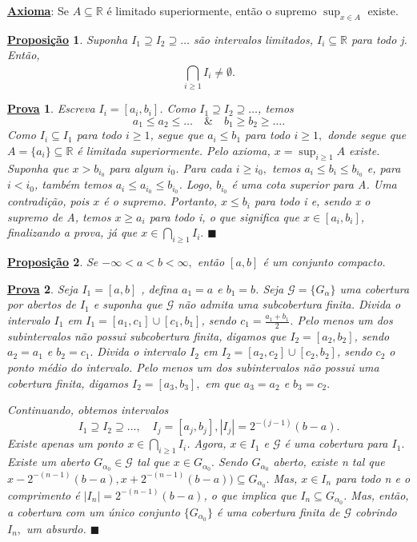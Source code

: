 \documentclass{article}
\newtheorem*{prop*}{\underline{Proposi\c c\~ao}}
\newtheorem*{proof*}{\underline{Prova}}
\renewcommand\qedsymbol{$\blacksquare$}
\begin{document}
\underline{\textbf{Axioma}}: Se \(A\subseteq \mathbb{R}\) é limitado superiormente, então o supremo \(\sup_{x\in A}\) existe.

\begin{prop*}
	Suponha \(I_{1}\supseteq I_{2}\supseteq \dotsc \) são intervalos limitados, \(I_{i}\subseteq \mathbb{R}\) para todo j. Então,
	\[
		\bigcap_{i\geq 1}^{}I_{i}\neq\emptyset.
	\]
\end{prop*}
\begin{proof*}
	Escreva \(I_{i} = [a_{i}, b_{i}]\). Como \(I_{1}\supseteq I_{2}\supseteq \dotsc \), temos
	\[
		a_{1} \leq a_{2} \leq \dotsc \quad\&\quad b_{1} \geq b_{2} \geq  \dotsc .
	\]
	Como \(I_{i}\subseteq I_{1}\) para todo \(i \geq 1\), segue que \(a_{i} \leq b_{1}\) para todo \(i\geq 1,\) donde segue que \(A = \{a_{i}\}\subseteq \mathbb{R}\) é limitada superiormente.
	Pelo axioma, \(x = \sup_{i\geq 1}A\) existe. Suponha que \(x > b_{i_{0}}\) para algum \(i_{0}\). Para cada \(i \geq i_{0},\) temos \(a_{i}\leq b_{i} \leq b_{i_{0}}\) e, para
	\(i < i_{0}\), também temos \(a_{i}\leq a_{i_{0}}\leq b_{i_{0}}\). Logo, \(b_{i_{0}}\) é uma cota superior para A. Uma contradição, pois \(x\) é o supremo. Portanto,
	\(x\leq b_{i}\) para todo i e, sendo x o supremo de A, temos \(x \geq a_{i}\) para todo i, o que significa que \(x\in [a_{i}, b_{i}]\), finalizando a prova, já que \(x\in \bigcap_{i\geq 1}^{}I_{i}.\) \qedsymbol
\end{proof*}
\begin{prop*}
	Se \(-\infty< a < b < \infty,\) então \([a, b]\) é um conjunto compacto.
\end{prop*}
\begin{proof*}
	Seja \(I_{1} = [a, b]\) , defina \(a_{1} = a \) e \(b_{1} = b\). Seja \(\mathcal{G} = \{G_{\alpha }\}\) uma cobertura por abertos de \(I_{1}\) e suponha
	que \(\mathcal{G}\) não admita uma subcobertura finita. Divida o intervalo \(I_{1}\) em \(I_{1} = [a_{1}, c_{1}]\cup [c_{1}, b_{1}]\), sendo \(c_{1} = \frac{a_{1}+b_{1}}{2}\). Pelo menos
	um dos subintervalos não possui subcobertura finita, digamos que \(I_{2} = [a_{2}, b_{2}]\), sendo \(a_{2} = a_{1}\) e \(b_{2} = c_{1}.\) Divida o intervalo \(I_{2}\) em \(I_{2} = [a_{2}, c_{2}]\cup [c_{2}, b_{2}]\), sendo
	\(c_{2}\) o ponto médio do intervalo. Pelo menos um dos subintervalos não possui uma cobertura finita, digamos \(I_{2} = [a_{3}, b_{3}],\) em que \(a_{3} = a_{2}\) e \(b_{3} = c_{2}.\)

	Continuando, obtemos intervalos
	\[
		I_{1}\supseteq I_{2}\supseteq \dotsc ,\quad I_{j} = [a_{j}, b_{j}], |I_{j}| = 2^{-(j-1)}(b-a).
	\]
	Existe apenas um ponto \(x\in \bigcap_{i\geq 1}^{}I_{i}\). Agora, \(x\in I_{1}\) e \(\mathcal{G}\) é uma cobertura para \(I_{1}.\) Existe um aberto \(G_{\alpha_{0}}\in \mathcal{G}\) tal que
	\(x\in G_{\alpha_{0}}.\) Sendo \(G_{\alpha_{0}}\) aberto, existe n tal que \(x - 2^{-(n-1)}(b-a), x+2^{-(n-1)}(b-a))\subseteq G_{\alpha_{0}}.\) Mas, \(x\in I_{n}\) para todo n e o comprimento
	é \(|I_{n}| = 2^{-(n-1)}(b-a)\), o que implica que \(I_{n}\subseteq G_{\alpha_{0}}\). Mas, então, a cobertura com um único conjunto \(\{G_{\alpha_{0}}\} \) é uma cobertura finita de \(\mathcal{G}\) cobrindo
	\(I_{n},\) um absurdo. \qedsymbol
\end{proof*}
\end{document}
